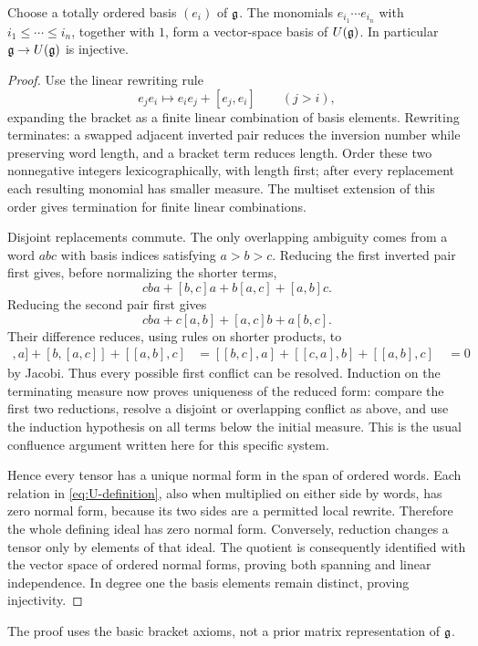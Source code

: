 \begin{theorem}\label{thm:PBW}
Choose a totally ordered basis $(e_i)$ of $\mathfrak g$. The monomials
$e_{i_1}\cdots e_{i_n}$ with $i_1\leq\cdots\leq i_n$, together with $1$, form a vector-space basis of $U(\mathfrak g)$. In particular $\mathfrak g\to U(\mathfrak g)$ is injective.
\end{theorem}
\begin{proof}
Use the linear rewriting rule
\begin{equation}\label{eq:PBW-rule}
 e_je_i\longmapsto e_ie_j+[e_j,e_i]\qquad(j>i),
\end{equation}
expanding the bracket as a finite linear combination of basis elements. Rewriting terminates: a swapped adjacent inverted pair reduces the inversion number while preserving word length, and a bracket term reduces length. Order these two nonnegative integers lexicographically, with length first; after every replacement each resulting monomial has smaller measure. The multiset extension of this order gives termination for finite linear combinations.

Disjoint replacements commute. The only overlapping ambiguity comes from a word $abc$ with basis indices satisfying $a>b>c$. Reducing the first inverted pair first gives, before normalizing the shorter terms,
\begin{equation*}
 cba+[b,c]a+b[a,c]+[a,b]c.
\end{equation*}
Reducing the second pair first gives
\begin{equation*}
 cba+c[a,b]+[a,c]b+a[b,c].
\end{equation*}
Their difference reduces, using rules on shorter products, to
\begin{align*}
 [[b,c],a]+[b,[a,c]]+[[a,b],c]
 &= [[b,c],a]+[[c,a],b]+[[a,b],c]\
 &=0
\end{align*}
by Jacobi. Thus every possible first conflict can be resolved. Induction on the terminating measure now proves uniqueness of the reduced form: compare the first two reductions, resolve a disjoint or overlapping conflict as above, and use the induction hypothesis on all terms below the initial measure. This is the usual confluence argument written here for this specific system.

Hence every tensor has a unique normal form in the span of ordered words. Each relation in \cref{eq:U-definition}, also when multiplied on either side by words, has zero normal form, because its two sides are a permitted local rewrite. Therefore the whole defining ideal has zero normal form. Conversely, reduction changes a tensor only by elements of that ideal. The quotient is consequently identified with the vector space of ordered normal forms, proving both spanning and linear independence. In degree one the basis elements remain distinct, proving injectivity.
\end{proof}
The proof uses the basic bracket axioms, not a prior matrix representation of $\mathfrak g$.

